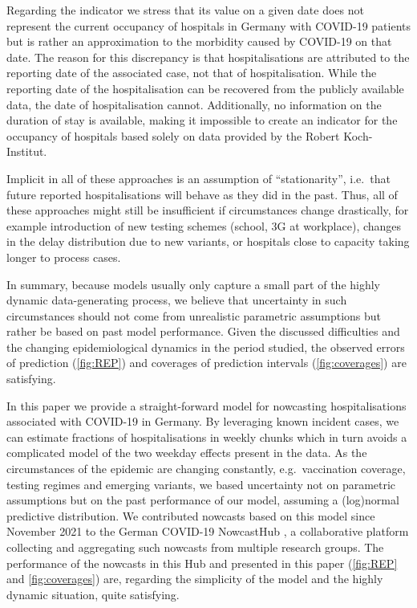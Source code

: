 Regarding the indicator we stress that its value on a given date does
not represent the current occupancy of hospitals in Germany with
COVID-19 patients but is rather an approximation to the morbidity caused
by COVID-19 on that date. The reason for this discrepancy is that
hospitalisations are attributed to the reporting date of the associated
case, not that of hospitalisation. While the reporting date of the
hospitalisation can be recovered from the publicly available data, the
date of hospitalisation cannot. Additionally, no information on the
duration of stay is available, making it impossible to create an
indicator for the occupancy of hospitals based solely on data provided
by the Robert Koch-Institut.

Implicit in all of these approaches is an assumption of
``stationarity'', i.e.~that future reported hospitalisations will behave
as they did in the past. Thus, all of these approaches might still be
insufficient if circumstances change drastically, for example
introduction of new testing schemes (school, 3G at workplace), changes
in the delay distribution due to new variants, or hospitals close to
capacity taking longer to process cases.

In summary, because models usually only capture a small part of the
highly dynamic data-generating process, we believe that uncertainty in
such circumstances should not come from unrealistic parametric
assumptions but rather be based on past model performance. Given the
discussed difficulties and the changing epidemiological dynamics in the
period studied, the observed errors of prediction (\cref{fig:REP})
and coverages of prediction intervals (\cref{fig:coverages}) are
satisfying.

In this paper we provide a straight-forward model for nowcasting
hospitalisations associated with COVID-19 in Germany. By leveraging
known incident cases, we can estimate fractions of hospitalisations in
weekly chunks which in turn avoids a complicated model of the two
weekday effects present in the data. As the circumstances of the
epidemic are changing constantly, e.g.~vaccination coverage, testing
regimes and emerging variants, we based uncertainty not on parametric
assumptions but on the past performance of our model, assuming a
(log)normal predictive distribution. We contributed nowcasts based on
this model since November 2021 to the German COVID-19 NowcastHub
\cite{2022Nowcasts}, a collaborative platform collecting and
aggregating such nowcasts from multiple research groups. The performance
of the nowcasts in this Hub and presented in this paper (\cref{fig:REP} and \cref{fig:coverages}) are, regarding the simplicity of
the model and the highly dynamic situation, quite satisfying.

